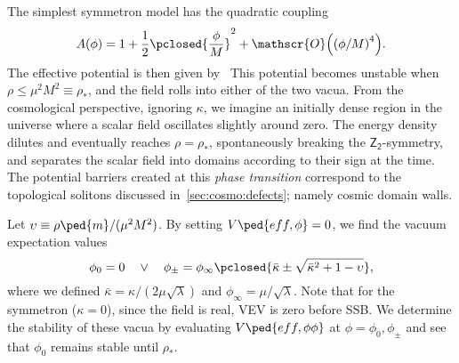     The simplest symmetron model has the quadratic coupling
    \begin{equation}
        A(\phi)  = 1 +\frac{1}{2} \pclosed{\frac{\phi}{M}}^2 + \mathscr{O}\Big( {(\phi/M)}^4 \Big).
    \end{equation}
    The effective potential is then given by~\citep{hinterbichlerSymmetronCosmology2011}
    This potential becomes unstable when $\rho\leq \mu^2M^2\equiv \rho_\ast$, and the field rolls into either of the two vacua. From the cosmological perspective, ignoring $\kappa$, we imagine an initially dense region in the universe where a scalar field oscillates slightly around zero. The energy density dilutes and eventually reaches $\rho=\rho_\ast$, spontaneously breaking the $\mathsf{Z_2}$-symmetry, and separates the scalar field into domains according to their sign at the time. The potential barriers created at this \emph{phase transition} correspond to the topological solitons discussed in~\cref{sec:cosmo:defects}; namely cosmic domain walls.




    Let $\upsilon\equiv\rho\ped{m}/(\mu^2M^2)$. By setting $V\ped{eff,\phi}=0$, we find the vacuum expectation values
    \begin{equation}
        \phi_0 = 0 \quad \lor \quad \phi_\pm = \phi_\infty \pclosed{\bar{\kappa} \pm  \sqrt{\bar{\kappa}^2 +  1- \upsilon }},%
    \end{equation}
    where we defined $\bar{\kappa} = \kappa / (2\mu \sqrt{\lambda}) $ and $\phi_\infty = \mu/\sqrt{\lambda}$. Note that for the symmetron ($\kappa=0$), since the field is real, VEV is zero before SSB. We determine the stability of these vacua by evaluating $V\ped{eff,\phi\phi}$ at $\phi=\phi_0,\phi_\pm$ and see that $\phi_0$ remains stable until $\rho_\ast$.



